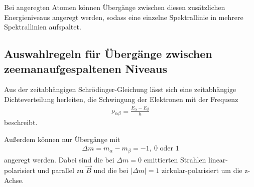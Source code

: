 \documentclass[captions=tableheading]{scrartcl}
\begin{document}
Bei angeregten Atomen können Übergänge zwischen diesen zusätzlichen Energieniveaus angeregt werden, sodass eine einzelne Spektrallinie in mehrere Spektrallinien aufspaltet.
\subsection{Auswahlregeln für Übergänge zwischen zeemanaufgespaltenen Niveaus}
Aus der zeitabhängigen Schrödinger-Gleichung lässt sich eine zeitabhängige Dichteverteilung herleiten, die Schwingung der Elektronen mit der Frequenz
\begin{align}
\nu_{\alpha\beta}=\frac{E_\alpha-E_\beta}{h}
\end{align}
beschreibt.

Außerdem können nur Übergänge mit 
\begin{align}
\Delta m = m_\alpha - m_\beta = -1,\ 0 \text{ oder } 1
\end{align}
angeregt werden.
Dabei sind die bei $\Delta m=0$ emittierten Strahlen linear-polarisiert und parallel zu $\vec{B}$ und die bei $\left|\Delta m \right|=1$ zirkular-polarisiert um die z-Achse.
\end{document}
